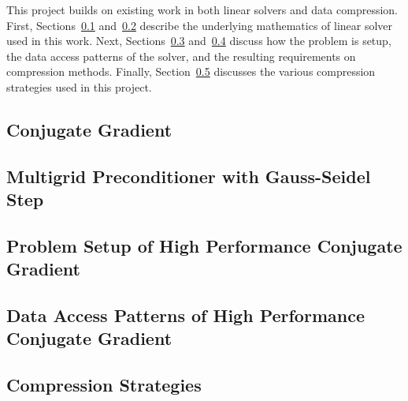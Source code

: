 This project builds on existing work in both linear solvers and data compression.
First, Sections~\ref{sec:bg-cg} and~\ref{sec:bg-mg} describe the underlying mathematics of linear solver used in this work.
Next, Sections~\ref{sec:bg-setup} and~\ref{sec:bg-da} discuss how the problem is setup, the data access patterns of the solver, and the resulting requirements on compression methods.
Finally, Section~\ref{sec:bg-comp} discusses the various compression strategies used in this project.

\subsection{Conjugate Gradient}
\label{sec:bg-cg}


\subsection{Multigrid Preconditioner with Gauss-Seidel Step}
\label{sec:bg-mg}


\subsection{Problem Setup of High Performance Conjugate Gradient}
\label{sec:bg-setup}


\subsection{Data Access Patterns of High Performance Conjugate Gradient}
\label{sec:bg-da}


\subsection{Compression Strategies}
\label{sec:bg-comp}

